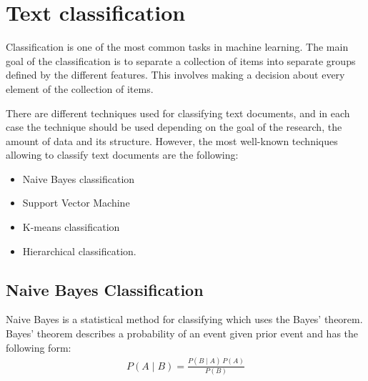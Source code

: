 \section{Text classification}
\label{sec:text_classification}

Classification is one of the most common tasks in machine learning. The main goal of the classification is to separate a collection of items into separate groups defined by the different features. This involves making a decision about every element of the collection of items.

There are different techniques used for classifying text documents, and in each case the technique should be used depending on the goal of the research, the amount of data and its structure. However, the most well-known techniques allowing to classify text documents are the following:
\begin{itemize}
    \item Naive Bayes classification
    \item Support Vector Machine
    \item K-means classification
    \item Hierarchical classification.
\end{itemize}

\subsection{Naive Bayes Classification}
Naive Bayes is a statistical method for classifying which uses the Bayes' theorem. Bayes' theorem describes a probability of an event given prior event and has the following form:
\begin{align}
    P(A \mid B) = \frac{P(B \mid A) \, P(A)}{P(B)}
\end{align}


